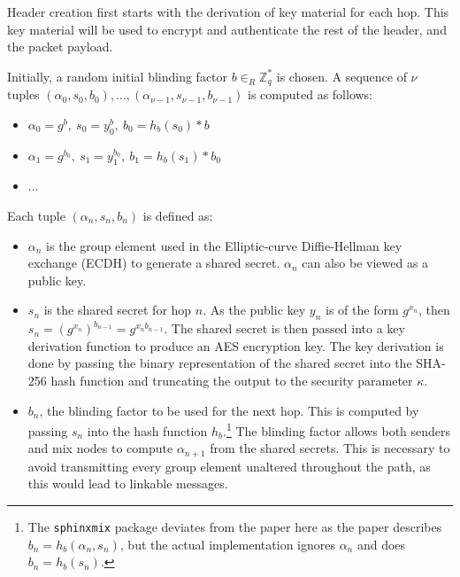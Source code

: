 \documentclass[final,dissertation.tex]{subfiles}
\begin{document}
Header creation first starts with the derivation of key material for each hop. This key material will be used to encrypt and authenticate the rest of the header, and the packet payload. 

Initially, a random initial blinding factor $b \in_R \mathbb{Z}^*_q$ is chosen. A sequence of $\nu$ tuples $(\alpha_0, s_0, b_0),...,(\alpha_{\nu-1}, s_{\nu-1}, b_{\nu-1})$ is computed as follows:

\begin{itemize}
	\setlength\itemsep{-0.4em}
	\item $\alpha_0 = g^b,\ s_0 = y_0^b,\ b_0 = h_b(s_0)*b$
	\item $\alpha_1 = g^{b_0},\ s_1 = y_1^{b_0},\ b_1 = h_b(s_1)*b_0$
	\item ...
\end{itemize}

Each tuple $(\alpha_n, s_n, b_n)$ is defined as:

\begin{itemize}
	\item $\alpha_n$ is the group element used in the Elliptic-curve Diffie-Hellman key exchange (ECDH) to generate a shared secret. $\alpha_n$ can also be viewed as a public key.
	
	\item $s_n$ is the shared secret for hop $n$. 
	As the public key $y_n$ is of the form $g^{x_n}$, then $s_n = (g^{x_n})^{b_{n-1}} = g^{{x_n}{b_{n-1}}}$. The shared secret is then passed into a key derivation function to produce an AES encryption key. The key derivation is done by passing the binary representation of the shared secret into the SHA-256 hash function and truncating the output to the security parameter $\kappa$.
	
	\item $b_n$, the blinding factor to be used for the next hop. This is computed by passing $s_n$ into the hash function $h_b$.\footnote{The \verb|sphinxmix| package deviates from the paper here as the paper describes $b_n = h_b(\alpha_n, s_n)$, but the actual implementation ignores $\alpha_n$ and does $b_n = h_b(s_n)$.}
	The blinding factor allows both senders and mix nodes to compute $\alpha_{n+1}$ from the shared secrets. This is necessary to avoid transmitting every group element unaltered throughout the path, as this would lead to linkable messages.
\end{itemize}
\end{document}
